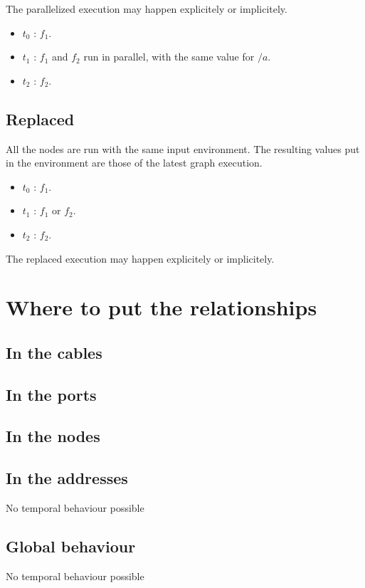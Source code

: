 \documentclass{article}
\begin{document}
    The parallelized execution may happen explicitely or implicitely.

    \begin{itemize}
        \item $t_0$ : $f_1$.
        \item $t_1$ : $f_1$ and $f_2$ run in parallel, with the same value for $/a$.
        \item $t_2$ : $f_2$. 
    \end{itemize}
     
	\subsection{Replaced}
	All the nodes are run with the same input environment. 
	The resulting values put in the environment are those of the latest graph execution.
	 
    \begin{itemize}
        \item $t_0$ : $f_1$.
        \item $t_1$ : $f_1$ or $f_2$.
        \item $t_2$ : $f_2$. 
    \end{itemize}

    The replaced execution may happen explicitely or implicitely.
    
    \section{Where to put the relationships}
    \subsection{In the cables}
    \subsection{In the ports}
    \subsection{In the nodes}
    \subsection{In the addresses}
    No temporal behaviour possible
    \subsection{Global behaviour}
    No temporal behaviour possible
\end{document}
